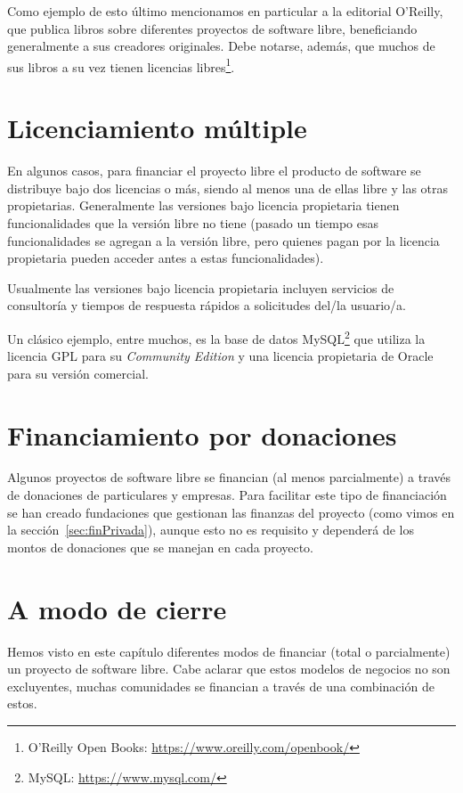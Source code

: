 Como ejemplo de esto último mencionamos en particular a la editorial O’Reilly, que publica libros sobre diferentes proyectos de software libre, beneficiando generalmente a sus creadores originales. Debe notarse, además, que muchos de sus libros a su vez tienen licencias libres\footnote{O'Reilly Open Books: \url{https://www.oreilly.com/openbook/}}.

\section{Licenciamiento múltiple}

En algunos casos, para financiar el proyecto libre el producto de software se distribuye bajo dos licencias o más, siendo al menos una de ellas libre y las otras propietarias. Generalmente las versiones bajo licencia propietaria tienen funcionalidades que la versión libre no tiene (pasado un tiempo esas funcionalidades se agregan a la versión libre, pero quienes pagan por la licencia propietaria pueden acceder antes a estas funcionalidades).

Usualmente las versiones bajo licencia propietaria incluyen servicios de consultoría y tiempos de respuesta rápidos a solicitudes del/la usuario/a.

Un clásico ejemplo, entre muchos, es la base de datos MySQL\footnote{MySQL: \url{https://www.mysql.com/}} que utiliza la licencia GPL para su \emph{Community Edition} y una licencia propietaria de Oracle para su versión comercial.

\section{Financiamiento por donaciones}

Algunos proyectos de software libre se financian (al menos parcialmente) a través de donaciones de particulares y empresas. Para facilitar este tipo de financiación se han creado fundaciones que gestionan las finanzas del proyecto (como vimos en la sección~\ref{sec:finPrivada}), aunque esto no es requisito y dependerá de los montos de donaciones que se manejan en cada proyecto.

\section{A modo de cierre}

Hemos visto en este capítulo diferentes modos de financiar (total o parcialmente) un proyecto de software libre. Cabe aclarar que estos modelos de negocios no son excluyentes, muchas comunidades se financian a través de una combinación de estos.



